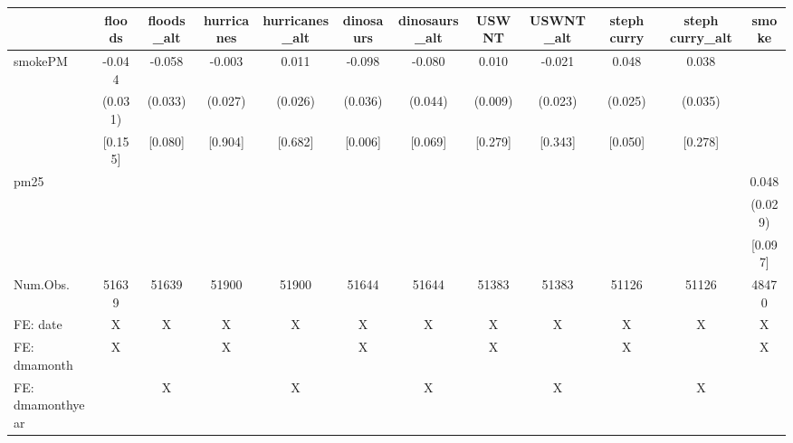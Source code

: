 \begin{table}
\centering
\begin{tabular}[t]{lccccccccccc}
\toprule
  & floods & floods\_alt & hurricanes & hurricanes\_alt & dinosaurs & dinosaurs\_alt & USWNT & USWNT\_alt & steph curry & steph curry\_alt & smoke\\
\midrule
smokePM & -0.044 & -0.058 & -0.003 & 0.011 & -0.098 & -0.080 & 0.010 & -0.021 & 0.048 & 0.038 & \\
 & (0.031) & (0.033) & (0.027) & (0.026) & (0.036) & (0.044) & (0.009) & (0.023) & (0.025) & (0.035) & \\
 & {}[0.155] & {}[0.080] & {}[0.904] & {}[0.682] & {}[0.006] & {}[0.069] & {}[0.279] & {}[0.343] & {}[0.050] & {}[0.278] & \\
pm25 &  &  &  &  &  &  &  &  &  &  & 0.048\\
 &  &  &  &  &  &  &  &  &  &  & (0.029)\\
 &  &  &  &  &  &  &  &  &  &  & {}[0.097]\\
\midrule
Num.Obs. & 51639 & 51639 & 51900 & 51900 & 51644 & 51644 & 51383 & 51383 & 51126 & 51126 & 48470\\
FE: date & X & X & X & X & X & X & X & X & X & X & X\\
FE: dmamonth & X &  & X &  & X &  & X &  & X &  & X\\
FE: dmamonthyear &  & X &  & X &  & X &  & X &  & X & \\
\bottomrule
\end{tabular}
\end{table}

